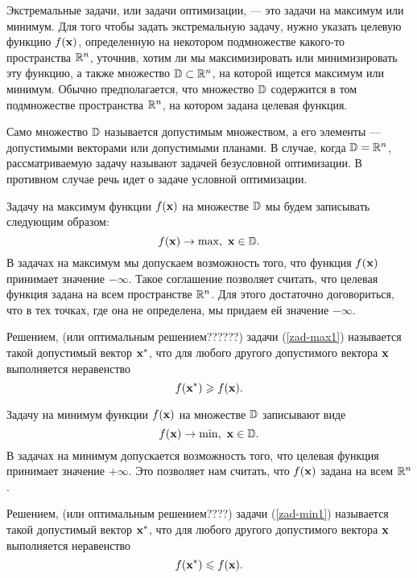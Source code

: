     Экстремальные задачи, или задачи оптимизации, --- это задачи на максимум или
    минимум.
    Для того чтобы задать экстремальную задачу, нужно указать целевую
    функцию $f(\mathbf{x})$, определенную на некотором подмножестве
    какого-то пространства $\mathbb{R}^{n}$,
    уточнив, хотим ли мы максимизировать или
    минимизировать эту функцию, а также множество $\mathbb{D}\subset\mathbb{R}^{n}$,
    на которой ищется максимум
    или минимум. Обычно предполагается, что множество $\mathbb{D}$ содержится
    в том подмножестве пространства $\mathbb{R}^{n}$, на котором задана целевая функция.



    Само множество $\mathbb{D}$ называется допустимым множеством, а его
    элементы --- допустимыми векторами или допустимыми планами. В случае, когда
    $\mathbb{D}=\mathbb{R}^{n}$, рассматриваемую
    задачу называют задачей безусловной оптимизации. В противном
    случае речь идет о задаче условной оптимизации.

    Задачу на максимум функции $f(\mathbf{x})$ на множестве $\mathbb{D}$
    мы будем записывать следующим образом:
\begin{equation}
\label{zad-max1}
    f(\mathbf{x})\rightarrow\max,\ \mathbf{x}\in\mathbb{D}.
\end{equation}
           В задачах на максимум мы допускаем возможность того, что
    функция $f(\mathbf{x})$ принимает значение $-\infty$. Такое соглашение
    позволяет считать, что целевая функция задана на всем
    пространстве $\mathbb{R}^{n}$. Для этого достаточно договориться, что в
    тех точках, где она не определена, мы придаем ей значение $-\infty$.

    Решением, (или оптимальным решением??????) задачи (\ref{zad-max1}) называется
    такой допустимый вектор $\mathbf{x^{*}}$, что для любого другого допустимого
    вектора $\mathbf{x}$ выполняется неравенство
    \[f(\mathbf{x^{*}})\geqslant f(\mathbf{x}).\]







    Задачу на минимум функции $f(\mathbf{x})$ на множестве $\mathbb{D}$
    записывают виде
\begin{equation}
\label{zad-min1}
    f(\mathbf{x})\rightarrow\min,\ \mathbf{x}\in\mathbb{D}.
\end{equation}
        В задачах на минимум допускается возможность того, что
    целевая функция  принимает значение $+\infty$. Это позволяет
    нам считать, что $f(\mathbf{x})$ задана на всем $\mathbb{R}^{n}$.

    Решением, (или оптимальным решением????) задачи (\ref{zad-min1}) называется
    такой допустимый вектор $\mathbf{x^{*}}$, что для любого другого допустимого
    вектора $\mathbf{x}$ выполняется неравенство
    \[f(\mathbf{x^{*}})\leqslant f(\mathbf{x}).\]




